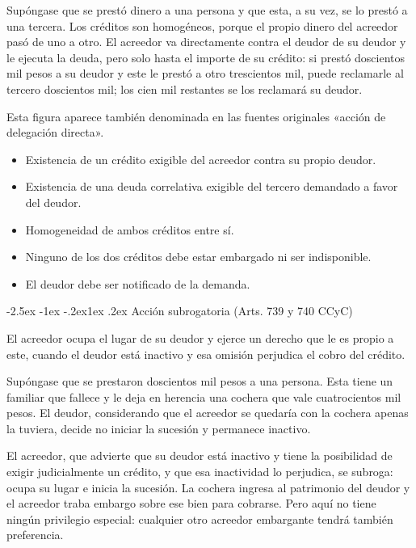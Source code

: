 \documentclass[12pt,oneside]{book}
\makeatletter
\renewcommand\subsection{\@startsection{subsection}{2}{\z@}%
  {-2.5ex \@plus -1ex \@minus -.2ex}{1ex \@plus .2ex}%
  {\normalfont\normalsize\bfseries}}
\makeatother
\begin{document}
\begin{ejemplo}
Supóngase que se prestó dinero a una persona y que esta, a su vez, se lo prestó a una tercera. Los créditos son homogéneos, porque el propio dinero del acreedor pasó de uno a otro. El acreedor va directamente contra el deudor de su deudor y le ejecuta la deuda, pero solo hasta el importe de su crédito: si prestó doscientos mil pesos a su deudor y este le prestó a otro trescientos mil, puede reclamarle al tercero doscientos mil; los cien mil restantes se los reclamará su deudor.
\end{ejemplo}

Esta figura aparece también denominada en las fuentes originales «acción de delegación directa».

\begin{regla}
\begin{itemize}
    \item Existencia de un crédito exigible del acreedor contra su propio deudor.
    \item Existencia de una deuda correlativa exigible del tercero demandado a favor del deudor.
    \item Homogeneidad de ambos créditos entre sí.
    \item Ninguno de los dos créditos debe estar embargado ni ser indisponible.
    \item El deudor debe ser notificado de la demanda.
\end{itemize}
\end{regla}

\subsection{Acción subrogatoria (Arts. 739 y 740 CCyC)}

\begin{definicion}
El acreedor ocupa el lugar de su deudor y ejerce un derecho que le es propio a este, cuando el deudor está inactivo y esa omisión perjudica el cobro del crédito.
\end{definicion}

\begin{ejemplo}
Supóngase que se prestaron doscientos mil pesos a una persona. Esta tiene un familiar que fallece y le deja en herencia una cochera que vale cuatrocientos mil pesos. El deudor, considerando que el acreedor se quedaría con la cochera apenas la tuviera, decide no iniciar la sucesión y permanece inactivo.

El acreedor, que advierte que su deudor está inactivo y tiene la posibilidad de exigir judicialmente un crédito, y que esa inactividad lo perjudica, se subroga: ocupa su lugar e inicia la sucesión. La cochera ingresa al patrimonio del deudor y el acreedor traba embargo sobre ese bien para cobrarse. Pero aquí no tiene ningún privilegio especial: cualquier otro acreedor embargante tendrá también preferencia.
\end{ejemplo}
\end{document}
